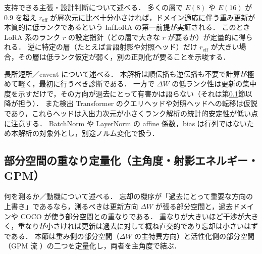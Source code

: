 支持できる主張・設計判断について述べる．
多くの層で $E(8)$ や $E(16)$ が $0.9$ を超え $r_{\mathrm{eff}}$ が層次元に比べ十分小さければ，ドメイン適応に伴う重み更新が本質的に低ランクであるという InfLoRA の第一前提が実証される．
このとき LoRA 系のランク $r$ の設定指針（どの層で大きな $r$ が要るか）が定量的に得られる．
逆に特定の層（たとえば言語射影や対照ヘッド）だけ $r_{\mathrm{eff}}$ が大きい場合，その層は低ランク仮定が弱く，別の正則化が要ることを示唆する．

長所短所／caveat について述べる．
本解析は順伝播も逆伝播も不要で計算が極めて軽く，最初に行うべき診断である．
一方で $\Delta W$ の低ランク性は更新の集中度を示すだけで，その方向が過去にとって有害かは語らない（それは第\ref{subsec:subspace-overlap}節以降が担う）．
また検出 Transformer のクエリヘッドや対照ヘッドへの転移は仮説であり，これらヘッドは入出力次元が小さくランク解析の統計的安定性が低い点に注意する．
BatchNorm や LayerNorm の affine 係数，bias は行列ではないため本解析の対象外とし，別途ノルム変化で扱う．


\subsection{部分空間の重なり定量化（主角度・射影エネルギー・GPM）}
\label{subsec:subspace-overlap}

何を測るか／動機について述べる．
忘却の機序が「過去にとって重要な方向の上書き」であるなら，測るべきは更新方向 $\Delta W$ が張る部分空間と，過去ドメインや COCO が使う部分空間との重なりである．
重なりが大きいほど干渉が大きく，重なりが小さければ更新は過去に対して概ね直交的であり忘却は小さいはずである．
本節は重み側の部分空間（$\Delta W$ の主特異方向）と活性化側の部分空間（GPM 流 \cite{gpm}）の二つを定量化し，両者を主角度で結ぶ．


